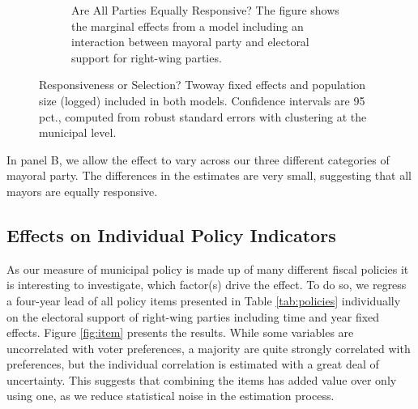 \documentclass[a4paper,12pt]{article}
\begin{document}
\begin{figure}[!htb]
\begin{subfigure}{0.45\textwidth}
		\caption{Are All Parties Equally Responsive? The figure shows the marginal effects from a model including an interaction between mayoral party and electoral support for right-wing parties.} \label{inter}
	\end{subfigure}
	\caption{Responsiveness or Selection? Twoway fixed effects and population size (logged) included in both models. Confidence intervals are 95 pct., computed from robust standard errors with clustering at the municipal level.}
	\label{fig:mech}
\end{figure}

In panel B, we allow the effect to vary across our three different categories of mayoral party. The differences in the estimates are very small, suggesting that all mayors are equally responsive.

\clearpage

\subsection{Effects on Individual Policy Indicators}
\label{item}
\setcounter{table}{0}
\setcounter{figure}{0}


As our measure of municipal policy is made up of many different fiscal policies it is interesting to investigate, which factor(s) drive the effect. To do so, we regress a four-year lead of all policy items presented in Table \ref{tab:policies} individually on the electoral support of right-wing parties including time and year fixed effects. Figure \ref{fig:item} presents the results. While some variables are uncorrelated with voter preferences, a majority are quite strongly correlated with preferences, but the individual correlation is estimated with a great deal of uncertainty. This suggests that combining the items has added value over only using one, as we reduce statistical noise in the estimation process. 
\end{document}
